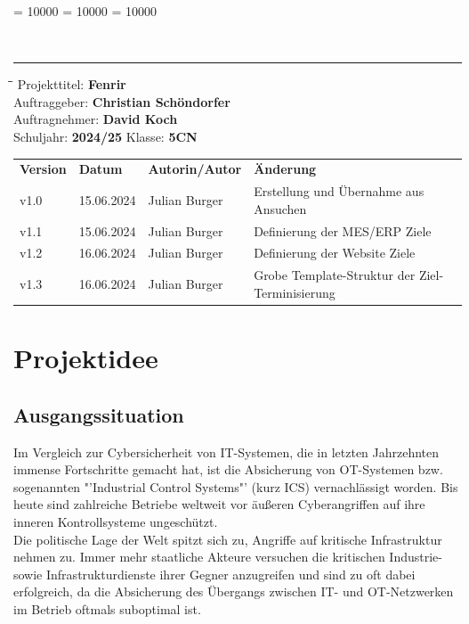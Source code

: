 \documentclass[
	headings=optiontotocandhead,%
	oneside,
	numbers=noenddot,%
	toc=flat, %
	10pt, %
	parskip=full, %
	listof=totoc, %
	listof=flat, %
	numbers=noenddot, %
	bibliography=totoc, %
	a4paper,DIV=14,
]{scrartcl}
\newcommand\Tstrut{\rule{0pt}{3.2ex}}         %
\newcommand\Bstrut{\rule[-1.5ex]{0pt}{0pt}}   %
\newenvironment{nstabbing}
	{\setlength{\topsep}{-\parskip}
		\setlength{\partopsep}{-\parskip}
		\tabbing}
	{\endtabbing}
\begin{document}
\clubpenalty = 10000 %
\widowpenalty = 10000 %
\displaywidowpenalty = 10000

{\sffamily{\textbf{\LARGE{\textcolor{orange}{Zieldefinition}}}}}\\
\noindent\rule{\textwidth}{0.1pt}
\begin{nstabbing}
	\hspace{4cm}\=\hspace{4cm}\=\hspace{4cm}\=\kill
	Projekttitel: \> \textbf{Fenrir}\\
	Auftraggeber: \> \textbf{Christian Schöndorfer}\\
	Auftragnehmer: \> \textbf{David Koch}\\
	Schuljahr: \> \textbf{2024/25}
	\> Klasse: \> \textbf{5CN}\\
\end{nstabbing}
{\smaller
	\begin{tabularx}{\textwidth}{l l l l}
	\hline
	\textbf{Version} & \textbf{Datum} & \textbf{Autorin/Autor} & \textbf{Änderung}\Tstrut  \\
	v1.0 & 15.06.2024 & Julian Burger & Erstellung und Übernahme aus Ansuchen \\
	v1.1 & 15.06.2024 & Julian Burger & Definierung der MES/ERP Ziele \\ 
	v1.2 & 16.06.2024 & Julian Burger & Definierung der Website Ziele \\
	v1.3 & 16.06.2024 & Julian Burger & Grobe Template-Struktur der Ziel-Ter­mi­ni­sie­rung \Bstrut \\
	\hline
	\end{tabularx}
}

\section{Projektidee}

\subsection{Ausgangssituation}
Im Vergleich zur Cybersicherheit von IT-Systemen, die in letzten Jahrzehnten immense Fortschritte gemacht hat, ist die Absicherung von OT-Systemen bzw. sogenannten "'Industrial Control Systems"' (kurz ICS) vernachlässigt worden. Bis heute sind zahlreiche Betriebe weltweit vor äußeren Cyberangriffen auf ihre inneren Kontrollsysteme ungeschützt. \\
Die politische Lage der Welt spitzt sich zu, Angriffe auf kritische Infrastruktur nehmen zu. Immer mehr staatliche Akteure versuchen die kritischen Industrie- sowie Infrastrukturdienste ihrer Gegner anzugreifen und sind zu oft dabei erfolgreich, da die Absicherung des Übergangs zwischen IT- und OT-Netzwerken im Betrieb oftmals suboptimal ist.
\end{document}
